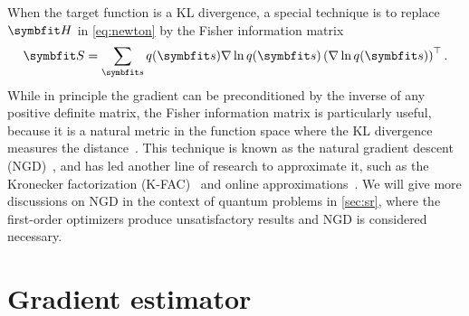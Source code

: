 When the target function is a KL divergence, a special technique is to replace $\mH$ in \cref{eq:newton} by the Fisher information matrix
\begin{equation}
\mS = \sum_\vs q(\vs) \nabla \ln q(\vs) \left( \nabla \ln q(\vs) \right)^\transpose.
\label{eq:fim}
\end{equation}
While in principle the gradient can be preconditioned by the inverse of any positive definite matrix, the Fisher information matrix is particularly useful, because it is a natural metric in the function space where the KL divergence measures the distance~\cite{martens2020new}. This technique is known as the natural gradient descent (NGD)~\cite{amari1998natural}, and has led another line of research to approximate it, such as the Kronecker factorization (K-FAC)~\cite{martens2015optimizing} and online approximations~\cite{roux2007topmoumoute, ollivier2017true}. We will give more discussions on NGD in the context of quantum problems in \cref{sec:sr}, where the first-order optimizers produce unsatisfactory results and NGD is considered necessary.

\section{Gradient estimator}

